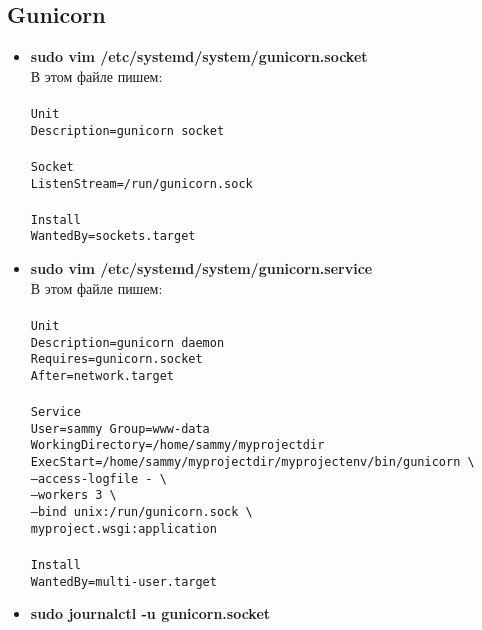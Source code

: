 \documentclass[14pt,a4paper,oneside]{extarticle}
\begin{document}
        \subsection{Gunicorn}
            \begin{itemize}
                \item \textbf{sudo vim /etc/systemd/system/gunicorn.socket} \\ 
                В этом файле пишем:\\\\
                \texttt{\lbrack Unit\rbrack\\
                Description=gunicorn socket\\
                \\
                \lbrack Socket\rbrack\\
                ListenStream=/run/gunicorn.sock\\
                \\
                \lbrack Install\rbrack\\
                WantedBy=sockets.target\\}

                \item \textbf{sudo vim /etc/systemd/system/gunicorn.service} \\
                В этом файле пишем:\\\\
                \texttt{\lbrack Unit\rbrack\\
                Description=gunicorn daemon\\
                Requires=gunicorn.socket\\
                After=network.target\\
                \\
                \lbrack Service\rbrack\\
                User=sammy
                Group=www-data \\
                WorkingDirectory=/home/sammy/myprojectdir \\
                ExecStart=/home/sammy/myprojectdir/myprojectenv/bin/gunicorn \textbackslash \\
                        --access-logfile - \textbackslash \\
                        --workers 3 \textbackslash \\
                        --bind unix:/run/gunicorn.sock \textbackslash \\
                        myproject.wsgi:application \\
                \\
                \lbrack Install\rbrack \\
                WantedBy=multi-user.target\\}

                \item \textbf{sudo journalctl -u gunicorn.socket}
            \end{itemize}
        
\end{document}
